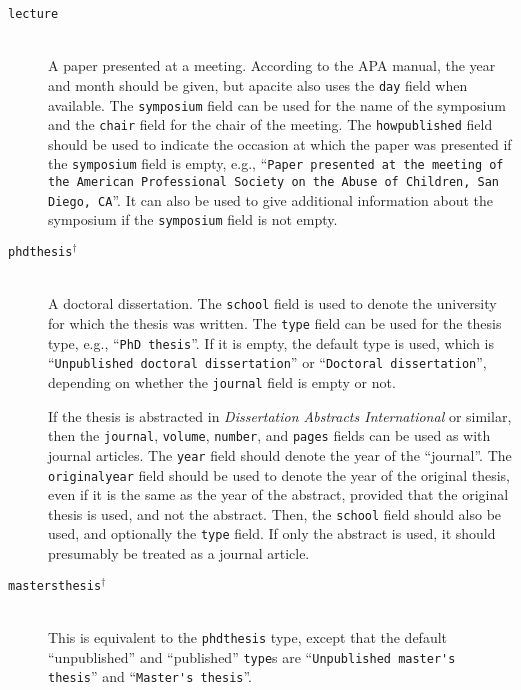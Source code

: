 \documentclass{article}
\newcommand{\LC}{\mbox{${}^{\dag}$}}%
\newcommand{\pkg}[1]{\textsf{#1}}%
\newcommand{\fieldname}[1]{\texttt{#1}}%
\newcommand{\entryname}[1]{\texttt{#1}}%
\begin{document}
\begin{description}
    \item[\entryname{lecture}] \mbox{}\\
        A paper presented at a meeting. According to the APA manual,
        the year and month should be given, but \pkg{apacite} also
        uses the \fieldname{day} field when available.
        The \fieldname{symposium} field can be used for the
        name of the symposium and the \fieldname{chair} field for the chair of
        the meeting. The \fieldname{howpublished} field should be used to
        indicate the occasion at which the paper was presented if the
        \fieldname{symposium} field is empty, e.g.,
        ``\texttt{Paper presented at the meeting of the American
                  Professional Society on the Abuse of Children,
                  San Diego, CA}''.
        It can also be used to give additional information about
        the symposium if the \fieldname{symposium} field is not empty.

    \item[\entryname{phdthesis}\LC] \mbox{}\\
        A doctoral dissertation. The \fieldname{school} field is used
        to denote the university for which the thesis was written.
        The \fieldname{type} field can be used for the thesis type,
        e.g., ``\verb+PhD thesis+''. If it is empty, the default type
        is used, which is ``\verb+Unpublished doctoral dissertation+''
        or ``\verb+Doctoral dissertation+'', depending on whether
        the \fieldname{journal} field is empty or not.

        If the thesis is abstracted in \emph{Dissertation Abstracts
        International} or similar, then the \fieldname{journal},
        \fieldname{volume}, \fieldname{number}, and \fieldname{pages} fields
        can be used as with journal articles. The \fieldname{year} field
        should denote the year of the ``journal''.
        The \fieldname{originalyear} field should be used to denote the year
        of the original thesis, even if it is the same as the year of the
        abstract, provided that the original thesis is used, and not
        the abstract. Then, the \fieldname{school} field should also
        be used, and optionally the \fieldname{type} field. If only
        the abstract is used, it should presumably be treated as a
        journal article.


    \item[\entryname{mastersthesis}\LC] \mbox{}\\
        This is equivalent to the \entryname{phdthesis} type, except that
        the default ``unpublished'' and ``published'' \fieldname{type}s are
        ``\verb+Unpublished master's thesis+'' and
        ``\verb+Master's thesis+''.


\end{description}
\end{document}
